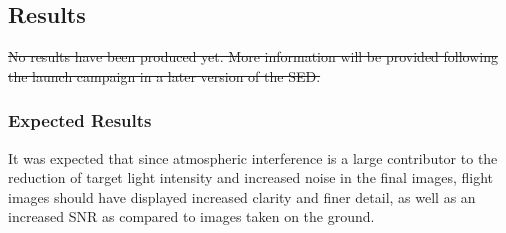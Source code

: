 \subsection{Results}

\st{No results have been produced yet. More information will be provided following the launch campaign in a later version of the SED.}

\subsubsection{Expected Results}

It was expected that since atmospheric interference is a large contributor to the reduction of target light intensity and increased noise in the final images, flight images should have displayed increased clarity and finer detail, as well as an increased SNR as compared to images taken on the ground. 

